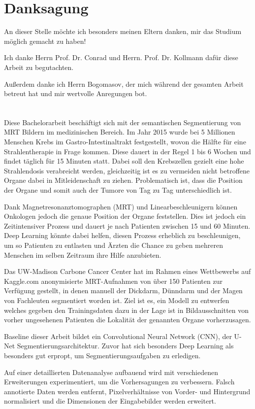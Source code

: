 
\section*{Danksagung}

An dieser Stelle möchte ich besonders meinen Eltern danken, mir das Studium möglich gemacht zu haben!

Ich danke Herrn Prof. Dr. Conrad und Herrn. Prof. Dr. Kollmann dafür diese Arbeit zu begutachten.

Außerdem danke ich Herrn Bogomasov, der mich während der gesamten Arbeit betreut hat und mir wertvolle Anregungen bot. 

\pagebreak
\section*{}


Diese Bachelorarbeit beschäftigt sich mit der semantischen Segmentierung von MRT Bildern im medizinischen Bereich. Im Jahr 2015 wurde bei 5 Millionen Menschen Krebs im Gastro-Intestinaltrakt festgestellt, wovon die Hälfte für eine Strahlentherapie in Frage kommen. Diese dauert in der Regel 1 bis 6 Wochen und findet täglich für 15 Minuten statt. Dabei soll den Krebszellen gezielt eine hohe Strahlendosis verabreicht werden, gleichzeitig ist es zu vermeiden nicht betroffene Organe dabei in Mitleidenschaft zu ziehen. Problematisch ist, dass  die Position der Organe und somit auch der Tumore von Tag zu Tag unterschiedlich ist. 

Dank Magnetresonanztomographen (MRT) und Linearbeschleunigern können Onkologen jedoch die genaue Position der Organe feststellen. Dies ist jedoch ein Zeitintensiver Prozess und dauert je nach Patienten zwischen 15 und 60 Minuten. Deep Learning könnte dabei helfen, diesen Prozess erheblich zu beschleunigen, um so Patienten zu entlasten und Ärzten die Chance zu geben mehreren Menschen im selben Zeitraum ihre Hilfe anzubieten. 

Das UW-Madison Carbone Cancer Center hat im Rahmen eines Wettbewerbs auf Kaggle.com anonymisierte MRT-Aufnahmen von über 150 Patienten zur Verfügung gestellt, in denen manuell der Dickdarm, Dünndarm und der Magen von Fachleuten segmentiert worden ist. Ziel ist es, ein Modell zu entwerfen welches gegeben den Trainingsdaten dazu in der Lage ist in Bildausschnitten von vorher ungesehenen Patienten die Lokalität der genannten Organe vorherzusagen. 

Baseline dieser Arbeit bildet ein Convolutional Neural Network (CNN), der U-Net Segmentierungsarchitektur. Zuvor hat sich besonders Deep Learning als besonders gut erpropt, um Segmentierungsaufgaben zu erledigen.

Auf einer detaillierten Datenanalyse aufbauend wird mit verschiedenen Erweiterungen experimentiert, um die Vorhersagungen zu verbessern. Falsch annotierte Daten werden entfernt, Pixelverhältnisse von Vorder- und Hintergrund normalisiert und die Dimensionen der Eingabebilder werden erweitert.